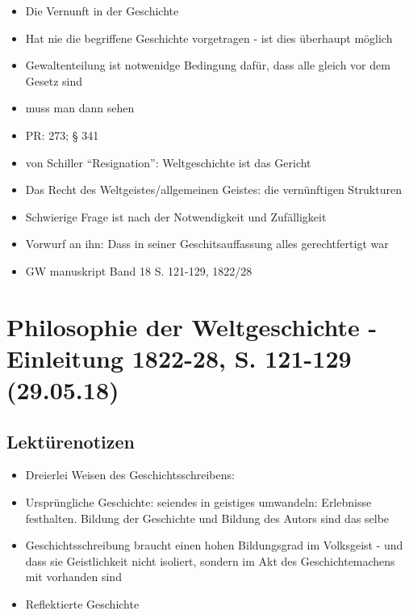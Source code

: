 \documentclass[emulatestandardclasses]{scrartcl}
\begin{document}
\begin{itemize}
  \item Die Vernunft in der Geschichte
  \item Hat nie die begriffene Geschichte vorgetragen - ist dies überhaupt möglich
  \item Gewaltenteilung ist notwenidge Bedingung dafür, dass alle gleich vor dem Gesetz sind
  \item muss man dann sehen
  \item PR: 273; § 341
  \item von Schiller "`Resignation"': Weltgeschichte ist das Gericht
  \item Das Recht des Weltgeistes/allgemeinen Geistes: die vernünftigen Strukturen
  \item Schwierige Frage ist nach der Notwendigkeit und Zufälligkeit
  \item Vorwurf an ihn: Dass in seiner Geschitsauffassung alles gerechtfertigt war
  \item GW manuskript Band 18 S. 121-129, 1822/28
\end{itemize}

\section{Philosophie der Weltgeschichte - Einleitung 1822-28, S. 121-129\\(29.05.18)}

\subsection{Lektürenotizen}

\begin{itemize}
  \item Dreierlei Weisen des Geschichtsschreibens:
  \item Ursprüngliche Geschichte: seiendes in geistiges umwandeln: Erlebnisse festhalten. Bildung der Geschichte und Bildung des Autors sind das selbe
  \item Geschichtsschreibung braucht einen hohen Bildungsgrad im Volksgeist - und dass sie Geistlichkeit nicht isoliert, sondern im Akt des Geschichtemachens mit vorhanden sind
  \item Reflektierte Geschichte
\end{itemize}
\end{document}
